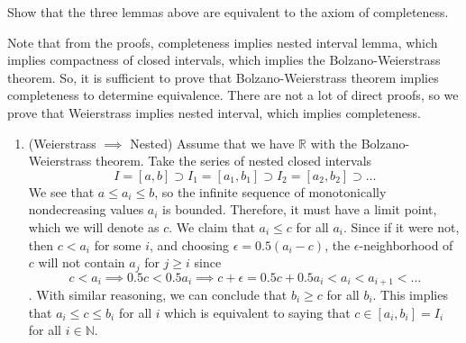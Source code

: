   \begin{exercise}[Zorich 2.3.4]
    Show that the three lemmas above are equivalent to the axiom of completeness. 
  \end{exercise}
  \begin{solution}
    Note that from the proofs, completeness implies nested interval lemma, which implies compactness of closed intervals, which implies the Bolzano-Weierstrass theorem. So, it is sufficient to prove that Bolzano-Weierstrass theorem implies completeness to determine equivalence. There are not a lot of direct proofs, so we prove that Weierstrass implies nested interval, which implies completeness. 
    \begin{enumerate}
      \item (Weierstrass $\implies$ Nested) Assume that we have $\mathbb{R}$ with the Bolzano-Weierstrass theorem. Take the series of nested closed intervals 
      \[I = [a, b] \supset I_1 = [a_1, b_1] \supset I_2 = [a_2, b_2] \supset \ldots\]
      We see that $a \leq a_i \leq b$, so the infinite sequence of monotonically nondecreasing values $a_i$ is bounded. Therefore, it must have a limit point, which we will denote as $c$. We claim that $a_i \leq c$ for all $a_i$. Since if it were not, then $c < a_i$ for some $i$, and choosing $\epsilon = 0.5 (a_i - c)$, the $\epsilon$-neighborhood of $c$ will not contain $a_j$ for $j \geq i$ since 
      \[c < a_i \implies 0.5 c < 0.5 a_i \implies c + \epsilon = 0.5c + 0.5 a_i < a_i< a_{i+1} < \ldots\]. 
      With similar reasoning, we can conclude that $b_i \geq c$ for all $b_i$. This implies that $a_i \leq c \leq b_i$ for all $i$ which is equivalent to saying that $c \in [a_i, b_i] = I_i$ for all $i \in \mathbb{N}$. 
      

\end{enumerate}
\end{solution}
